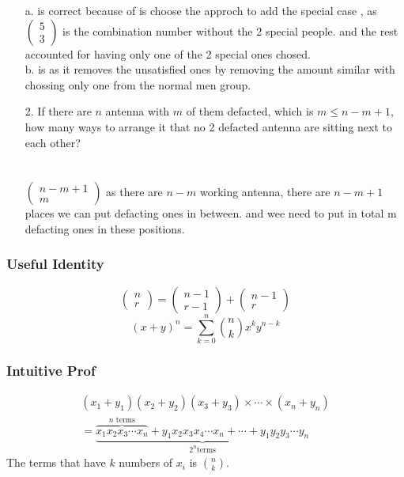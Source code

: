 \documentclass{article}
\begin{document}
\begin{itemize}
\begin{itemize}
\end{itemize}

a. is correct because of is choose the approch to add the special case , as \(\begin{pmatrix}5\\3\end{pmatrix}\)
is the combination number without the 2 special people. and the rest accounted for having only one of the 2 special ones chosed.
\\ b. is as it removes the unsatisfied ones by removing the amount similar with chossing only one from the normal men group.
    \item [2.] If there are \(n\) antenna with \(m\) of them defacted, which is \(m\leq n-m+1\), how many ways to arrange it that no 
    2 defacted antenna are sitting next to each other?
    \\ \\ \\
    \(\begin{pmatrix}
        n-m+1\\
        m
    \end{pmatrix}\)
    as there are \(n-m\) working antenna, there are \(n-m+1\) places we can put defacting ones in between. and wee need to put in total m 
    defacting ones in these positions.

\end{itemize}
\subsubsection*{Useful Identity}

\[
\begin{pmatrix}
    n\\r
\end{pmatrix}=
\begin{pmatrix}
    n-1\\r-1
\end{pmatrix}+
\begin{pmatrix}
    n-1\\r
\end{pmatrix}
\]
\[(x+y)^n=\sum_{k=0}^n \binom{n}{k}x^ky^{n-k}\]
\subsubsection*{Intuitive Prof}
\begin{align*}
    (x_1+y_1)(x_2+y_2)(x_3+y_3)\times\cdots\times(x_n+y_n)\\
    =\underbrace{\overbrace{x_1x_2x_3\cdots x_n}^{n \text{ terms}}+y_1x_2x_3x_4\cdots x_n+\cdots+y_1y_2y_3\cdots y_n}_{2^n \text{terms}}
\end{align*}
The terms that have \(k\) numbers of \(x_i\) is \(\binom{n}{k}\).
\end{document}
